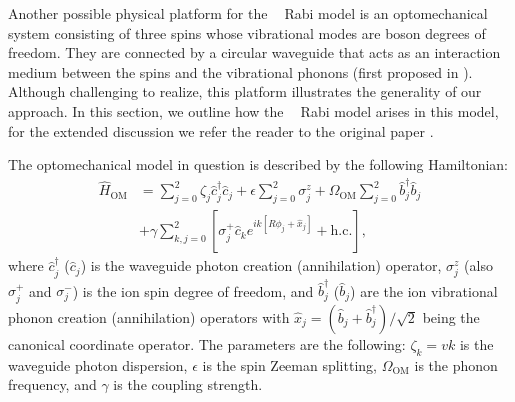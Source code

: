 \documentclass[reprint, aps, prx, amsmath, amssymb, longbibliography, superscriptaddress]{revtex4-2}
\DeclareMathOperator{\Zthree}{\mathbb{Z}_3}
\begin{document}
Another possible physical platform for the $\Zthree$ Rabi model is an optomechanical system consisting of three spins whose vibrational modes are boson degrees of freedom. They are connected by a circular waveguide that acts as an interaction medium between the spins and the vibrational phonons (first proposed in \cite{sedov_chiral_2020}). Although challenging to realize, this platform illustrates the generality of our approach. In this section, we outline how the $\Zthree$ Rabi model arises in this model, for the extended discussion we refer the reader to the original paper \cite{sedov_chiral_2020}. 

The optomechanical model in question is described by the following Hamiltonian:
\begin{equation}
\label{eq:optomechanical-qb-ring}
\begin{aligned}
    \hat{H}_{\text{OM}}&=\sum\limits_{j=0}^2 \zeta_j \hat{c}_j^{\dagger} \hat{c}_j + 
 \epsilon \sum_{j=0}^2 \sigma_j^z + \Omega_{\text{OM}} \sum_{j=0}^2 \hat{b}_j^{\dagger} \hat{b}_j \\
    &+\gamma \sum_{k, j=0}^2 \left[\sigma_j^{+} \hat{c}_k e^{i k\left[R \phi_j+\hat x_j\right]}+\text {h.c.}\right] \text {, }
\end{aligned}   
\end{equation}
where $\hat c_j^\dagger$ ($\hat c_j$) is the waveguide photon creation (annihilation) operator, $\sigma^z_j$ (also $\sigma_j^+$ and $\sigma_j^-$) is the ion spin degree of freedom, and $\hat b^{\dagger}_j$ ($\hat b_j$) are the ion vibrational phonon creation (annihilation) operators with $\hat x_j = (\hat b_j + \hat b_j^{\dagger})/\sqrt{2}$ being the canonical coordinate operator. The parameters are the following: 
$\zeta_k = v k$ is the waveguide photon dispersion, $\epsilon$ is the spin Zeeman splitting, $\Omega_{\text{OM}}$ is the phonon frequency, and $\gamma$ is the coupling strength.
\end{document}
